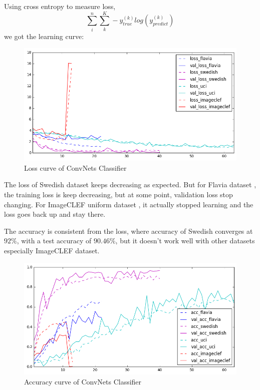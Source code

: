 \documentclass[journal, 10pt]{IEEEtran}
\begin{document}
  Using cross entropy to measure loss,
  \begin{equation*}
    \sum_i^n\sum_k^K -y_{true}^{(k)} log(y_{predict}^{(k)})
  \end{equation*}
  we got the learning curve:
  \begin{figure}[H]
    \centering
    \includegraphics[scale=0.4]{cnn_loss}
    \caption{Loss curve of ConvNets Classifier}
    \label{cnn_loss}
  \end{figure}
  The loss of Swedish dataset \cite{SwedishLeafDataset} keeps decreasing as expected. But for Flavia dataset \cite{FlaviaDataset}, the training loss is keep decreasing, but at some point, validation loss stop changing. For ImageCLEF uniform dataset \cite{ImageCLEF2013}, it actually stopped learning and the loss goes back up and stay there.

  The accuracy is consistent from the loss, where accuracy of Swedish converges at $92\%$, with a test accuracy of $90.46\%$, but it doesn't work well with other datasets especially ImageCLEF dataset.
  \begin{figure}[H]
    \centering
    \includegraphics[scale=0.4]{cnn_acc}
    \caption{\label{fig:cnn_acc} Accuracy curve of ConvNets Classifier}
    \label{cnn_acc}
  \end{figure}
\end{document}

